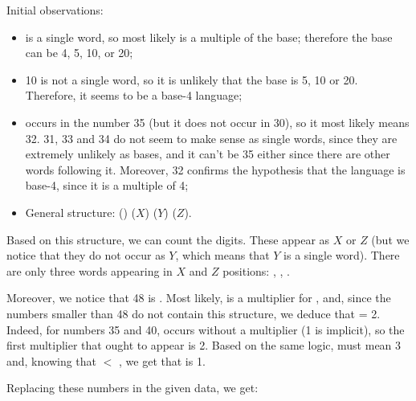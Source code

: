 \begin{refsection}
\begin{mysolution}
Initial observations:
\begin{itemize}
    \item {} is a single word, so most likely is a multiple of the base; therefore the base can be 4, 5, 10, or 20;
    \item 10 is not a single word, so it is unlikely that the base is 5, 10 or 20. Therefore, it seems to be a base-4 language;
    \item {} occurs in the number 35 (but it does not occur in 30), so it most likely means 32. 31, 33 and 34 do not seem to make sense as single words, since they are extremely unlikely as bases, and it can't be 35 either since there are other words following it. Moreover, 32 confirms the hypothesis that the language is base-4, since it is a multiple of 4;
    \item General structure: () ($X$) ($Y$) ($Z$).
\end{itemize}

 Based on this structure, we can count the digits. These appear as $X$ or $Z$ (but we notice that they do not occur as $Y$, which means that $Y$ is a single word). There are only three words appearing in $X$ and $Z$ positions: , , .

Moreover, we notice that 48 is . Most likely,  is a multiplier for , and, since the numbers smaller than 48 do not contain this structure, we deduce that  = 2. Indeed, for numbers 35 and 40,  occurs without a multiplier (1 is implicit), so the first multiplier that ought to appear is 2. Based on the same logic,  must mean 3 and, knowing that  $<$ , we get that  is 1.

Replacing these numbers in the given data, we get:


\end{mysolution}
\end{refsection}
